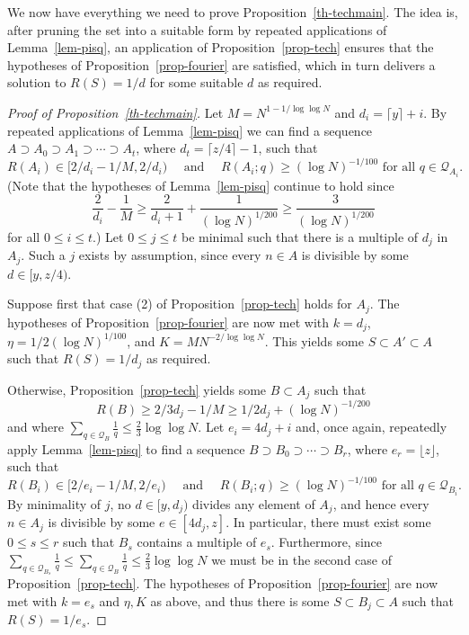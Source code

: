 \documentclass[12pt]{amsart}
\begin{document}
We now have everything we need to prove Proposition~\ref{th-techmain}. The idea is, after pruning the set into a suitable form by repeated applications of Lemma~\ref{lem-pisq}, an application of Proposition~\ref{prop-tech} ensures that the hypotheses of Proposition~\ref{prop-fourier} are satisfied, which in turn delivers a solution to $R(S)=1/d$ for some suitable $d$ as required.

\begin{proof}[Proof of Proposition~\ref{th-techmain}]
Let $M=N^{1-1/\log\log N}$ and $d_i = \lceil y \rceil +i$. By repeated applications of Lemma~\ref{lem-pisq} we can find a sequence $A\supset A_0\supset A_1\supset\cdots \supset A_{t}$, where $d_t=\lceil z/4\rceil-1$, such that
\[R(A_i)\in [2/d_i-1/M,2/d_i)\quad\textrm{ and }\quad R(A_i;q)\geq (\log N)^{-1/100}\textrm{ for all }q\in \mathcal{Q}_{A_i}.\]
(Note that the hypotheses of Lemma~\ref{lem-pisq} continue to hold since 
\[\frac{2}{d_i}-\frac{1}{M}\geq \frac{2}{d_{i}+1}+\frac{1}{(\log N)^{1/200}}\geq \frac{3}{(\log N)^{1/200}}\]
for all $0\leq i\leq t$.) Let $0\leq j\leq t$ be minimal such that there is a multiple of $d_j$ in $A_j$. Such a $j$ exists by assumption, since every $n\in A$ is divisible by some $d\in[y,z/4)$. 

Suppose first that case (2) of Proposition~\ref{prop-tech} holds for $A_j$. The hypotheses of Proposition~\ref{prop-fourier} are now met with $k=d_j$, $\eta=1/2(\log N)^{1/100}$, and $K=MN^{-2/\log \log N}$. This yields some $S\subset A'\subset A$ such that $R(S)=1/d_j$ as required.

Otherwise, Proposition~\ref{prop-tech} yields some $B\subset A_j$ such that 
\[R(B)\geq 2/3d_j-1/M\geq 1/2d_j+(\log N)^{-1/200}\]
and where $\sum_{q\in\mathcal{Q}_B}\frac{1}{q}\leq \frac{2}{3}\log\log N$. Let $e_i = 4d_j+i$ and, once again, repeatedly apply Lemma~\ref{lem-pisq} to find a sequence $B\supset B_0\supset \cdots\supset B_r$, where $e_r=\lfloor z\rfloor$, such that
\[R(B_i)\in [2/e_i-1/M,2/e_i)\quad\textrm{ and }\quad R(B_i;q)\geq (\log N)^{-1/100}\textrm{ for all }q\in \mathcal{Q}_{B_i}.\]
By minimality of $j$, no $d\in [y,d_j)$ divides any element of $A_j$, and hence every $n\in A_j$ is divisible by some $e\in [4d_j,z]$. In particular, there must exist some $0\leq s\leq r$ such that $B_s$ contains a multiple of $e_s$. Furthermore, since $\sum_{q\in \mathcal{Q}_{B_s}}\frac{1}{q}\leq \sum_{q\in\mathcal{Q}_B}\frac{1}{q}\leq \frac{2}{3}\log\log N$ we must be in the second case of Proposition~\ref{prop-tech}. The hypotheses of Proposition~\ref{prop-fourier} are now met with $k=e_s$ and $\eta,K$ as above, and thus there is some $S\subset B_j\subset A$ such that $R(S)=1/e_s$. 
\end{proof}
\end{document}
